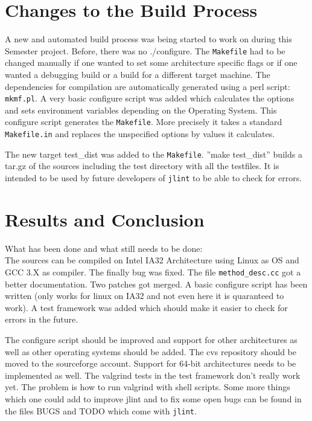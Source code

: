 \documentclass[11pt,twoside,a4paper,draft]{article}
\begin{document}
\section {Changes to the Build Process}

A new and automated build process was being started to work on during this 
Semester project. Before, there was no ./configure. The \texttt{Makefile} had
to be changed
manually if one wanted to set some architecture specific flags or if one wanted
a debugging build or a build for a different target machine. The dependencies 
for compilation are automatically generated using a perl script: 
\texttt{mkmf.pl}. A very basic configure script was added which calculates the
options and sets environment variables depending on the Operating System. This
configure script generates the \texttt{Makefile}. More precisely it takes a 
standard \texttt{Makefile.in} and replaces the unspecified options by values 
it calculates.

The new target test\_dist was added to the \texttt{Makefile}. 
''make test\_dist'' builds a tar.gz of the sources including the test 
directory with all the testfiles. It is intended to be used by future 
developers of \texttt{jlint} to be able to check for errors.

\section {Results and Conclusion}

What has been done and what still needs to be done:
\\
The sources can be compiled on Intel IA32 Architecture using Linux as OS and
GCC 3.X as compiler. The finally bug was fixed. The file 
\texttt{method\_desc.cc} got a better documentation. Two patches got merged.
A basic configure script has been written (only works for linux on IA32 and 
not even here it is quaranteed to work). A test framework was added which 
should make it easier to check for errors in the future.

The configure script should be improved and support for other architectures as
well as other operating systems should be added. The cvs repository should be
moved to the sourceforge account. Support for 64-bit architectures needs to be implemented as well. The valgrind tests in the test framework
don't really work yet. The problem is how to run valgrind with shell scripts.
Some more things which one could add to improve jlint and to fix some open bugs
can be found in the files BUGS and TODO which come with \texttt{jlint}.
\end{document}
